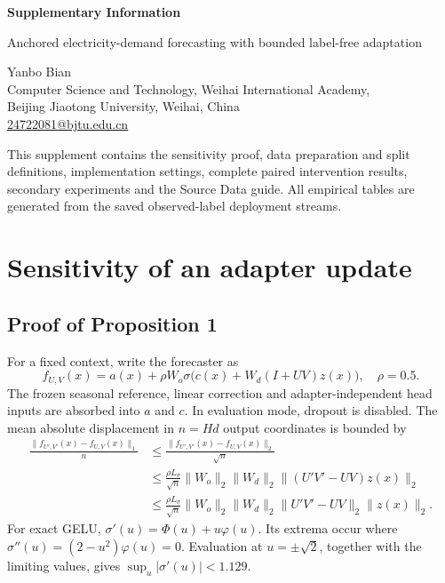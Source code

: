 \documentclass[11pt,a4paper]{article}
\begin{document}
\begin{center}
{\LARGE\bfseries Supplementary Information}\par\vspace{5mm}
{\Large Anchored electricity-demand forecasting with bounded label-free adaptation}\par\vspace{4mm}
Yanbo Bian\\Computer Science and Technology, Weihai International Academy,\\Beijing Jiaotong University, Weihai, China\\\href{mailto:24722081@bjtu.edu.cn}{24722081@bjtu.edu.cn}
\end{center}
\vspace{5mm}
This supplement contains the sensitivity proof, data preparation and split definitions, implementation settings, complete paired intervention results, secondary experiments and the Source Data guide. All empirical tables are generated from the saved observed-label deployment streams.
\tableofcontents

\section{Sensitivity of an adapter update}
\subsection{Proof of Proposition 1}
For a fixed context, write the forecaster as
\begin{equation}
 f_{U,V}(x)=a(x)+\rho W_o\sigma\big(c(x)+W_d(I+UV)z(x)\big),\quad \rho=0.5.
\end{equation}
The frozen seasonal reference, linear correction and adapter-independent head inputs are absorbed into $a$ and $c$. In evaluation mode, dropout is disabled. The mean absolute displacement in $n=Hd$ output coordinates is bounded by
\begin{align}
\frac{\|f_{U',V'}(x)-f_{U,V}(x)\|_1}{n}
&\leq \frac{\|f_{U',V'}(x)-f_{U,V}(x)\|_2}{\sqrt n}\\
&\leq \frac{\rho L_\sigma}{\sqrt n}\|W_o\|_2\|W_d\|_2
\|(U'V'-UV)z(x)\|_2\\
&\leq \frac{\rho L_\sigma}{\sqrt n}\|W_o\|_2\|W_d\|_2
\|U'V'-UV\|_2\|z(x)\|_2.
\end{align}
For exact GELU, $\sigma'(u)=\Phi(u)+u\varphi(u)$. Its extrema occur where $\sigma''(u)=(2-u^2)\varphi(u)=0$. Evaluation at $u=\pm\sqrt2$, together with the limiting values, gives $\sup_u|\sigma'(u)|<1.129$.
\end{document}
